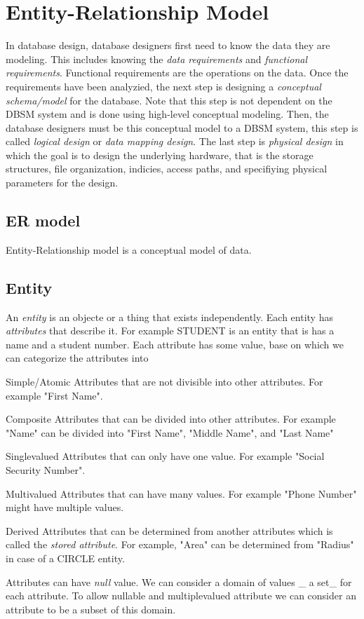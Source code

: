 \chapter{Entity-Relationship Model}
In database design, database designers first need to know the data they are modeling. This includes knowing the \textit{data requirements} and \textit{functional requirements}. Functional requirements are the operations on the data. Once the requirements have been analyzied, the next step is designing a \textit{conceptual schema/model} for the database. Note that this step is not dependent on the DBSM system and is done using high-level conceptual modeling. Then, the database designers must be this conceptual model to a DBSM system, this step is called \textit{logical design} or \textit{data mapping design}. The last step is \textit{physical design} in which the goal is to design the underlying hardware, that is the storage structures, file organization, indicies, access paths, and specifiying physical parameters for the design.

\section{ER model}
Entity-Relationship model is a conceptual model of data.
\section{Entity}
An \textit{entity} is  an objecte or a thing that exists independently. Each entity has \textit{attributes} that describe it. For example STUDENT is an entity that is has a name and a student number. Each attribute has some value, base on which we can categorize the attributes into 
\begin{definition}
    \item [Simple/Atomic] Attributes that are not divisible into other attributes. For example "First Name".
    \item [Composite] Attributes that can be divided into other attributes. For example "Name" can be divided into "First Name", "Middle Name", and "Last Name" 
    \item [Singlevalued] Attributes that can only have one value. For example "Social Security Number".
    \item [Multivalued] Attributes that can have many values. For example "Phone Number" might have multiple values. 
    \item [Derived] Attributes that can be determined from another attributes which is called the \textit{stored attribute}. For example, "Area" can be determined from "Radius" in case of a CIRCLE entity.  
\end{definition}
Attributes can have \textit{null} value. We can consider a domain of values \_ a set\_ for each attribute. To allow nullable and multiplevalued attribute we can consider an attribute to be a subset of this domain. 

